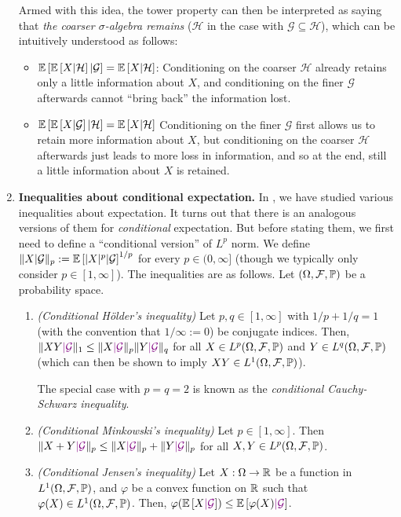 \begin{enumerate}
\begin{remark}
Armed with this idea, the tower property can then be interpreted as saying that
\emph{the coarser \(\sigma\)-algebra remains} (\(\mathcal{H}\) in the case with
\(\mathcal{G}\subseteq \mathcal{H}\)), which can be intuitively understood as
follows:
\begin{itemize}
\item \(\mathbb{E}\left[\mathbb{E}\left[X|\mathcal{H}\right]|\mathcal{G}\right]=\mathbb{E}\left[X|\mathcal{H}\right]\):
Conditioning on the coarser \(\mathcal{H}\) already retains only a little
information about \(X\), and conditioning on the finer \(\mathcal{G}\)
afterwards cannot ``bring back'' the information lost.
\item \(\mathbb{E}\left[\mathbb{E}\left[X|\mathcal{G}\right]|\mathcal{H}\right]=\mathbb{E}\left[X|\mathcal{H}\right]\)
Conditioning on the finer \(\mathcal{G}\) first allows us to retain more
information about \(X\), but conditioning on the coarser \(\mathcal{H}\)
afterwards just leads to more loss in information, and so at the end, still a
little information about \(X\) is retained.
\end{itemize}
\end{remark}
\item \textbf{Inequalities about conditional expectation.}
In , we have
studied various inequalities about expectation. It turns out that there is an
analogous versions of them for \emph{conditional} expectation. But before
stating them, we first need to define a ``conditional version'' of \(L^{p}\)
norm. We define \(\|X|\mathcal{G}\|_{p}:=\mathbb{E}\left[|X|^{p}|\mathcal{G}\right]^{1/p}\)
for every \(p\in (0,\infty]\) (though we typically only consider \(p\in[1,\infty]\)).
The inequalities are as follows. Let \((\Omega,\mathcal{F},\mathbb{P})\) be a
probability space.
\begin{enumerate}
\item \label{it:cond-holder-cs-ineq} \emph{(Conditional H\"older's inequality)}
Let \(p,q\in [1,\infty]\) with \(1/p+1/q=1\) (with the convention that
\(1/\infty:=0\)) be conjugate indices. Then, \(\|XY\vc{|\mathcal{G}}\|_{1}\le
\|X\vc{|\mathcal{G}}\|_{p}\|Y\vc{|\mathcal{G}}\|_{q}\) for all \(X\in
L^{p}(\Omega,\mathcal{F},\mathbb{P})\) and \(Y\in L^{q}(\Omega,\mathcal{F},\mathbb{P})\)
(which can then be shown to imply \(XY\in L^{1}(\Omega,\mathcal{F},\mathbb{P})\)).

\begin{note}
The special case with \(p=q=2\) is known as the \emph{conditional
Cauchy-Schwarz inequality}.
\end{note}
\item \label{it:cond-minkowski-ineq} \emph{(Conditional Minkowski's inequality)}
Let \(p\in [1,\infty]\). Then \(\|X+Y\vc{|\mathcal{G}}\|_{p}\le \|X\vc{|\mathcal{G}}\|_{p}+\|Y\vc{|\mathcal{G}}\|_{p}\) for all
\(X,Y\in L^{p}(\Omega,\mathcal{F},\mathbb{P})\).
\item \label{it:cond-jensen-ineq} \emph{(Conditional Jensen's inequality)}
Let \(X:\Omega\to\mathbb{R}\) be a function in \(L^{1}(\Omega,\mathcal{F},\mathbb{P})\), and
\(\varphi\) be a convex function on \(\mathbb{R}\) such that \(\varphi(X)\in
L^{1}(\Omega,\mathcal{F},\mathbb{P})\). Then,
\(\varphi(\expv{X\vc{|\mathcal{G}}})\le\expv{\varphi(X)\vc{|\mathcal{G}}}\).


\end{enumerate}
\end{enumerate}

